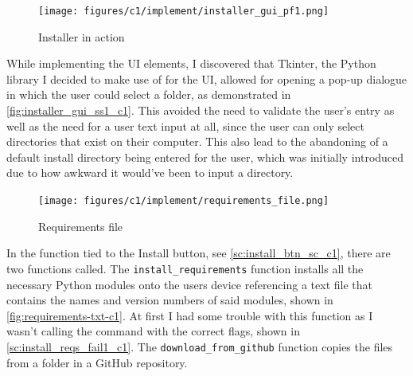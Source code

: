\documentclass[11pt]{article}
\begin{document}
            \begin{figure}[!ht]
                \centering
                \texttt{[image: figures/c1/implement/installer\_gui\_pf1.png]}
                \caption{Installer in action}
                \label{fig:installer_gui_ss1_c1}
            \end{figure}


            While implementing the UI elements, I discovered that Tkinter, the Python library I decided to make use of for the UI, allowed for opening a pop-up dialogue in which the user could select a folder, as demonstrated in \autoref{fig:installer_gui_ss1_c1}.
            This avoided the need to validate the user's entry as well as the need for a user text input at all, since the user can only select directories that exist on their computer. 
            This also lead to the abandoning of a default install directory being entered for the user, which was initially introduced due to how awkward it would've been to input a directory.

            \begin{figure}[!h]
                \centering
                \texttt{[image: figures/c1/implement/requirements\_file.png]}
                \caption{Requirements file}
                \label{fig:requirements-txt-c1}
            \end{figure}

            In the function tied to the Install button, see \autoref{sc:install_btn_sc_c1}, there are two functions called.
            The \verb|install_requirements| function installs all the necessary Python modules onto the users device referencing a text file that contains the names and version numbers of said modules, shown in \autoref{fig:requirements-txt-c1}. At first I had some trouble with this function as I wasn't calling the command with the correct flags, shown in \autoref{sc:install_reqs_fail1_c1}. 
            The \verb|download_from_github| function copies the files from a folder in a GitHub repository. 
\end{document}
